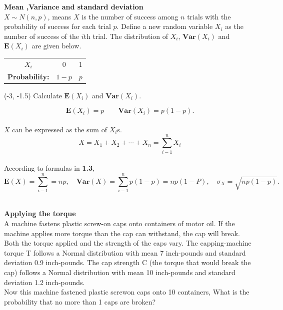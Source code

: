 \documentclass[a4paper, 12pt,twoside]{book}
\begin{document}
       \noindent\textbf{Mean ,Variance  and standard deviation}\vspace{0.6cm}\\
       $X\sim N(n,p)$, means $X$ is the number of success among $n$ trials with the probability of success for each trial $p$. Define a new random variable $X_i$ as the number of success of the $i$th trial. The distribution of $X_i$, $\textbf{Var}(X_i)$ and $\textbf{E}(X_i)$ are given below.
       \begin{table}[H]
       \centering
           \begin{tabular}{ccc}
               \hline
               $X_i$&0&1\\
               \textbf{Probability:}&$1-p$&$p$\\
               \hline
           \end{tabular}
       \end{table}

    \begin{textblock}{4}(-3, -1.5)
    \noindent Calculate $\textbf{E}(X_i)$ and $\textbf{Var}(X_i)$.
    \end{textblock}
     $$\textbf{E}(X_i)=p \qquad \textbf{Var}(X_i) = p(1-p).$$
     \vspace{0.3cm}\\
     
     $X$ can be expressed as the sum of  $X_i$s.
     $$X = X_1 + X_2 + \cdots + X_n = \sum _{i-1}^n X_i$$
     \vspace{0.3cm}\\
     According to formulas in \textbf{1.3},
     $$\textbf{E}(X) = \sum _{i-1}^n  = np, \quad \textbf{Var}(X) = \sum _{i-1}^n p(1-p) = np(1-P), \quad \sigma_X = \sqrt{np(1-p)}.$$
     \vspace{0.6cm}\\
 
       \noindent \colorbox{champagne}{\parbox{\textwidth}{
       \textbf{Applying the torque}\vspace{0.3cm}\\
        A machine fastens plastic screw-on caps onto containers of motor oil. If the machine applies more torque than the cap can withstand, the cap will break. Both the torque applied and the strength of the caps vary. The capping-machine torque T follows a Normal distribution with mean 7 inch-pounds and standard deviation 0.9 inch-pounds. The cap strength C (the torque that would break the cap) follows a Normal distribution with mean 10 inch-pounds and standard deviation 1.2 inch-pounds. \vspace{0.3cm}\\
        Now this machine fastened plastic screw\textendash on caps onto 10 containers, What is the probability that no more than 1 caps are broken?
       }}
     \newpage
     
\end{document}
